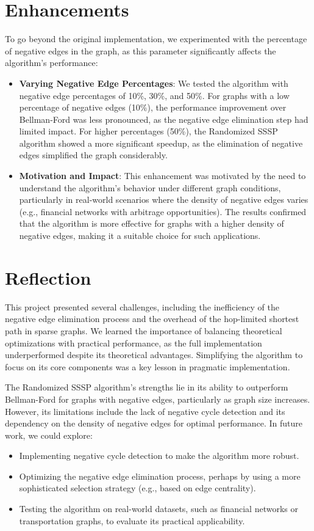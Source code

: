 \documentclass[12pt]{article}
\begin{document}
\section{Enhancements}
To go beyond the original implementation, we experimented with the percentage of negative edges in the graph, as this parameter significantly affects the algorithm’s performance:
\begin{itemize}
    \item \textbf{Varying Negative Edge Percentages}: We tested the algorithm with negative edge percentages of 10\%, 30\%, and 50\%. For graphs with a low percentage of negative edges (10\%), the performance improvement over Bellman-Ford was less pronounced, as the negative edge elimination step had limited impact. For higher percentages (50\%), the Randomized SSSP algorithm showed a more significant speedup, as the elimination of negative edges simplified the graph considerably.
    \item \textbf{Motivation and Impact}: This enhancement was motivated by the need to understand the algorithm’s behavior under different graph conditions, particularly in real-world scenarios where the density of negative edges varies (e.g., financial networks with arbitrage opportunities). The results confirmed that the algorithm is more effective for graphs with a higher density of negative edges, making it a suitable choice for such applications.
\end{itemize}

\section{Reflection}
This project presented several challenges, including the inefficiency of the negative edge elimination process and the overhead of the hop-limited shortest path in sparse graphs. We learned the importance of balancing theoretical optimizations with practical performance, as the full implementation underperformed despite its theoretical advantages. Simplifying the algorithm to focus on its core components was a key lesson in pragmatic implementation.

The Randomized SSSP algorithm’s strengths lie in its ability to outperform Bellman-Ford for graphs with negative edges, particularly as graph size increases. However, its limitations include the lack of negative cycle detection and its dependency on the density of negative edges for optimal performance. In future work, we could explore:
\begin{itemize}
    \item Implementing negative cycle detection to make the algorithm more robust.
    \item Optimizing the negative edge elimination process, perhaps by using a more sophisticated selection strategy (e.g., based on edge centrality).
    \item Testing the algorithm on real-world datasets, such as financial networks or transportation graphs, to evaluate its practical applicability.
\end{itemize}
\end{document}
